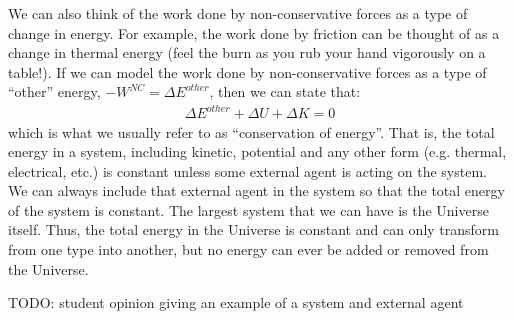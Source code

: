 We can also think of the work done by non-conservative forces as a type of change in energy. For example, the work done by friction can be thought of as a change in thermal energy (feel the burn as you rub your hand vigorously on a table!). If we can model the work done by non-conservative forces as a type of ``other'' energy, $-W^{NC}=\Delta E^{other}$, then we can state that:
\begin{align*}
\Delta E^{other} + \Delta U + \Delta K =0
\end{align*}
which is what we usually refer to as ``conservation of energy''. That is, the total energy in a system, including kinetic, potential and any other form (e.g. thermal, electrical, etc.) is constant unless some external agent is acting on the system. \\

We can always include that external agent in the system so that the total energy of the system is constant. The largest system that we can have is the Universe itself. Thus, the total energy in the Universe is constant and can only transform from one type into another, but no energy can ever be added or removed from the Universe.

TODO: student opinion giving an example of a system and external agent

